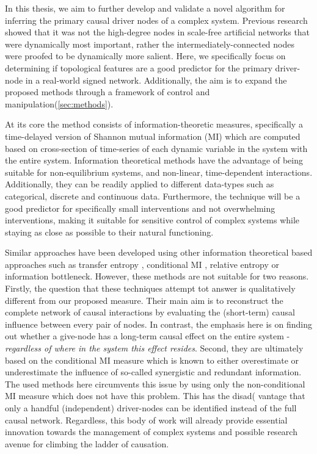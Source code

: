 \documentclass[twoside, twocolumn]{article}
\begin{document}
	In this thesis, we aim to further develop and validate a novel algorithm for inferring the primary causal driver nodes of a complex system\cite{Quax2013}. Previous research showed that it was not the high-degree nodes in scale-free artificial networks that were dynamically most important, rather the intermediately-connected nodes were proofed to be dynamically more salient. Here, we specifically focus on determining if topological features are a good predictor for the primary driver-node in a real-world signed network.  Additionally, the aim is to expand the proposed methods through a framework of control and manipulation(\ref{sec:methods}). 
	
	At its core the method consists of information-theoretic measures, specifically a time-delayed version of Shannon mutual information (MI)\cite{Cover2005} which are computed based on cross-section of time-series of each dynamic variable in the system with the entire system. Information theoretical methods have the advantage of being suitable for non-equilibrium systems, and non-linear,  time-dependent interactions. Additionally, they can be readily applied to different data-types such as categorical, discrete and continuous data. Furthermore, the technique will be a good predictor for specifically small interventions and not overwhelming interventions, making it suitable for sensitive control of complex systems while staying as close as possible to their natural functioning. 
	
	Similar approaches have been developed using other information theoretical based approaches such as transfer entropy \cite{Eichler2006}, conditional MI \cite{Wibral2014}, relative entropy\cite{AY2008} or information bottleneck\cite{Tishby2000}. However, these methods are not suitable for two reasons. Firstly, the  question that these techniques attempt tot answer is qualitatively different from our proposed measure. Their main aim is to reconstruct the complete network of causal interactions by evaluating the (short-term) causal influence between every pair of nodes. In contrast, the emphasis here is on finding out whether a give-node has a long-term causal effect on the entire system - \textit{regardless of where in the system this effect resides}. Second, they are ultimately based on the conditional MI measure which is known to either overestimate or underestimate the influence of so-called synergistic and redundant information\cite{James2016a}. The used methods here circumvents this issue by using only the non-conditional MI measure which does not have this problem. This has the disad\left( vantage that only a handful (independent) driver-nodes can be identified instead of the full causal network. Regardless, this body of work will already provide essential innovation towards the management of complex systems and possible research avenue for climbing the ladder of causation.
	
\end{document}
